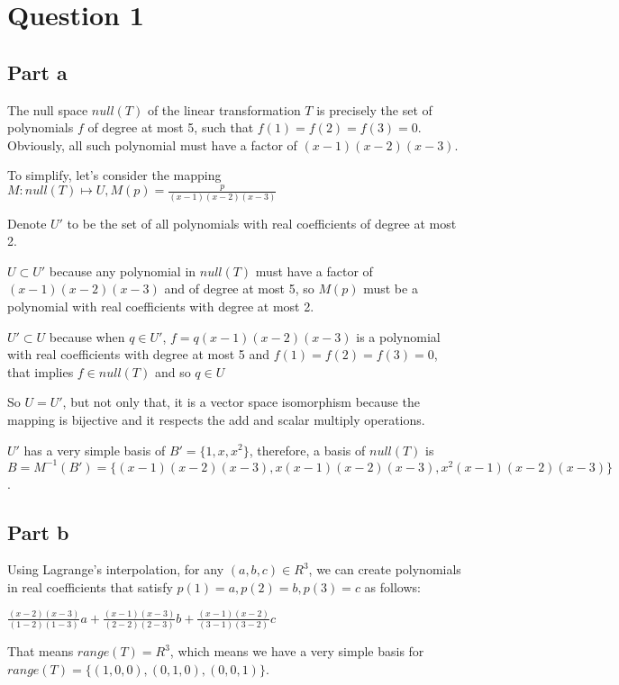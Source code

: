 \section*{Question 1}
\subsection*{Part a}
The null space $ null(T) $ of the linear transformation $ T $ is precisely the set of polynomials $ f $ of degree at most 5, such that $ f(1) = f(2) = f(3) = 0 $. Obviously, all such polynomial must have a factor of $ (x - 1)(x - 2)(x - 3) $. 

To simplify, let's consider the mapping $ M : null(T) \mapsto U, M(p) = \frac{p}{(x - 1)(x - 2)(x - 3)} $

Denote $ U' $ to be the set of all polynomials with real coefficients of degree at most 2.

$ U \subset U' $ because any polynomial in $ null(T) $ must have a factor of $ (x - 1)(x - 2)(x - 3) $ and of degree at most 5, so $ M(p) $ must be a polynomial with real coefficients with degree at most 2.

$ U' \subset U $ because when $ q \in U' $, $ f = q(x - 1)(x - 2)(x - 3) $ is a polynomial with real coefficients with degree at most 5 and $ f(1) = f(2) = f(3) = 0 $, that implies $ f \in null(T) $ and so $ q \in U $

So $ U = U' $, but not only that, it is a vector space isomorphism because the mapping is bijective and it respects the add and scalar multiply operations.

$ U' $ has a very simple basis of $ B' = \{1, x, x^2 \} $, therefore, a basis of $ null(T) $ is $ B = M^{-1}(B') = \{(x - 1)(x - 2)(x - 3), x(x - 1)(x - 2)(x - 3), x^2(x - 1)(x - 2)(x - 3) \} $.

\subsection*{Part b}
Using Lagrange's interpolation, for any $ (a,b,c) \in R^3 $, we can create polynomials in real coefficients that satisfy $ p(1) = a, p(2) = b, p(3) = c $ as follows:

$ \frac{(x-2)(x-3)}{(1-2)(1-3)}a + \frac{(x-1)(x-3)}{(2-2)(2-3)}b + \frac{(x-1)(x-2)}{(3-1)(3-2)}c $

That means $ range(T) = R^3 $, which means we have a very simple basis for $ range(T) = \{(1,0,0), (0,1,0), (0,0,1) \} $.
